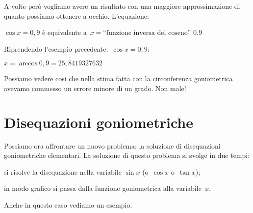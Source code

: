 A volte però vogliamo avere un risultato con una maggiore approssimazione di 
quanto possiamo ottenere a occhio. L'equazione:
\begin{center}
\(\cos x = 0,9\) è equivalente 
a~\(x = \text{``funzione inversa del coseno'' } 0.9\)
\end{center}


\begin{esempio}
 Riprendendo l'esempio precedente:~\(\cos x = 0,9\):
 
 \(x = \arccos 0,9 = 25,8419327632\) 
 
 Possiamo vedere così che nella stima fatta con la circonferenza goniometrica 
 avevamo commesso un errore minore di un grado. Non male!
\end{esempio}


\section{Disequazioni goniometriche}
\label{sec:gonio_disequazionigonio}

Possiamo ora affrontare un nuovo problema: la soluzione di disequazioni 
goniometriche elementari. La soluzione di questo problema si svolge in due 
tempi:
\begin{enumerate*}
 \item si risolve la disequazione nella variabile \(\sin x\) 
  (o~\(\cos x\) o~\(\tan x\));
 \item in modo grafico si passa dalla funzione goniometrica alla 
variabile~\(x\).
\end{enumerate*}

Anche in questo caso vediamo un esempio.

